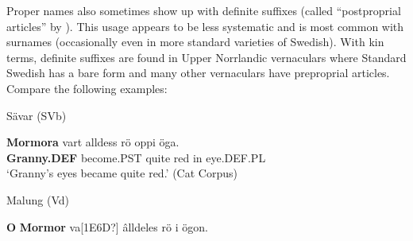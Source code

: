 
Proper names also sometimes show up with definite suffixes (called “postproprial articles” by \citet[23]{Delsing2003a}). This usage appears to be less systematic and is most common with surnames (occasionally even in more standard varieties of Swedish). With kin terms, definite suffixes are found in Upper Norrlandic vernaculars where Standard Swedish has a bare form and many other vernaculars have preproprial articles. Compare the following examples:


\item 


\item 

Sävar (SVb)



 \ea\label{}
\gll \textbf{Mormora} vart  alldess  rö  oppi  öga.\\


\textbf{Granny.DEF} become.PST  quite  red  in  eye.DEF.PL\\

\glt ‘Granny’s eyes became quite red.’ (Cat Corpus)

\z

\item 

Malung (Vd)



 \ea\label{}
\gll \textbf{O} \textbf{Mormor} va[1E6D?]  âlldeles  rö  i  ögon.\\


